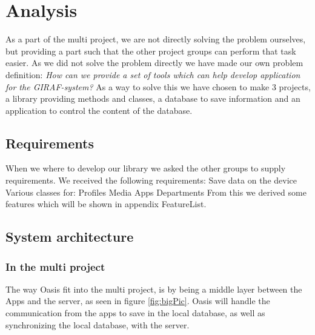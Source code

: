 \chapter{Analysis}
As a part of the multi project, we are not directly solving the problem ourselves, but providing a part such that the other project groups can perform that task easier.
As we did not solve the problem directly we have made our own problem definition:
	\textit{How can we provide a set of tools which can help develop application for the GIRAF-system?}
As a way to solve this we have chosen to make 3 projects, a library providing methods and classes, a database to save information and an application to control the content of the database. 

\section{Requirements}
When we where to develop our library we asked the other groups to supply requirements. We received the following requirements:
Save data on the device
Various classes for:
Profiles
Media
Apps
Departments
From this we derived some features which will be shown in appendix FeatureList.

\section{System architecture}
\subsection{In the multi project}
The way Oasis fit into the multi project, is by being a middle layer between the Apps and the server, as seen in figure \vref{fig:bigPic}. Oasis will handle the communication from the apps to save in the local database, as well as synchronizing the local database, with the server.

